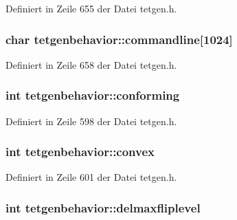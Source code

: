 Definiert in Zeile 655 der Datei tetgen.\-h.

\hypertarget{classtetgenbehavior_a56dcfc2ab395c63b7f99d84b2cd1f4e8}{
\subsubsection[{commandline}]{\setlength{\rightskip}{0pt plus 5cm}char tetgenbehavior\-::commandline\mbox{[}1024\mbox{]}}}\label{classtetgenbehavior_a56dcfc2ab395c63b7f99d84b2cd1f4e8}


Definiert in Zeile 658 der Datei tetgen.\-h.

\hypertarget{classtetgenbehavior_ac02fe16d48959b6ba9d85a1a3f5a0187}{
\subsubsection[{conforming}]{\setlength{\rightskip}{0pt plus 5cm}int tetgenbehavior\-::conforming}}\label{classtetgenbehavior_ac02fe16d48959b6ba9d85a1a3f5a0187}


Definiert in Zeile 598 der Datei tetgen.\-h.

\hypertarget{classtetgenbehavior_a691a8d3d667ed0709c7995248731c57d}{
\subsubsection[{convex}]{\setlength{\rightskip}{0pt plus 5cm}int tetgenbehavior\-::convex}}\label{classtetgenbehavior_a691a8d3d667ed0709c7995248731c57d}


Definiert in Zeile 601 der Datei tetgen.\-h.

\hypertarget{classtetgenbehavior_a4da6a5712b049c2bd9585fb6fe1d6cba}{
\subsubsection[{delmaxfliplevel}]{\setlength{\rightskip}{0pt plus 5cm}int tetgenbehavior\-::delmaxfliplevel}}\label{classtetgenbehavior_a4da6a5712b049c2bd9585fb6fe1d6cba}


